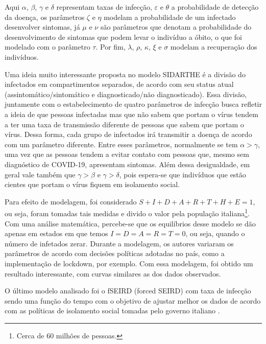 \documentclass{article}
\begin{document}
Aqui $\alpha$, $\beta$, $\gamma$ e $\delta$ representam taxas de infecção, $\varepsilon$ e $\theta$ a probabilidade de detecção da doença, os parâmetros $\zeta$ e $\eta$ modelam a probabilidade de um infectado desenvolver sintomas, já $\mu$ e $\nu$ são parâmetros que denotam a probabilidade do desenvolvimento de sintomas que podem levar o indivíduo a óbito, o que foi modelado com o parâmetro $\tau$. Por fim, $\lambda$, $\rho$, $\kappa$, $\xi$ e $\sigma$ modelam a recuperação dos indivíduos.

Uma ideia muito interessante proposta no modelo SIDARTHE é a divisão do infectados em compartimentos separados, de acordo com seu status atual (assintomático/sintomático e diagnosticado/não diagnosticado). Essa divisão, juntamente com o estabelecimento de quatro parâmetros de infecção busca refletir a ideia de que pessoas infectadas mas que não sabem que portam o vírus tendem a ter uma taxa de transmissão diferente de pessoas que sabem que portam o vírus. Dessa forma, cada grupo de infectados irá transmitir a doença de acordo com um parâmetro diferente. Entre esses parâmetros, normalmente se tem $\alpha > \gamma$, uma vez que as pessoas tendem a evitar contato com pessoas que, mesmo sem diagnóstico de COVID-19, apresentam sintomas. Além dessa desigualdade, em geral vale também que $\gamma > \beta$ e $\gamma > \delta$, pois espera-se que indivíduos que estão cientes que portam o vírus fiquem em isolamento social.

Para efeito de modelagem, foi considerado $S + I + D + A + R + T + H + E = 1$, ou seja, foram tomadas tais medidas e divido o valor pela população italiana\footnote{Cerca de 60 milhões de pessoas.}. Com uma análise matemática, percebe-se que os equilíbrios desse modelo se dão apenas em estados em que temos $I = D = A = R = T = 0$, ou seja, quando o número de infetados zerar. Durante a modelagem, os autores variaram os parâmetros de acordo com decisões políticas adotadas no país, como a implementação de lockdown, por exemplo. Com essa modelagem, foi obtido um resultado interessante, com curvas similares as dos dados observados.
% 

O último modelo analisado foi o fSEIRD (forced SEIRD) com taxa de infecção sendo uma função do tempo com o objetivo de ajustar melhor os dados de acordo com as políticas de isolamento social tomadas pelo governo italiano \cite{piccolomini}.
\end{document}
